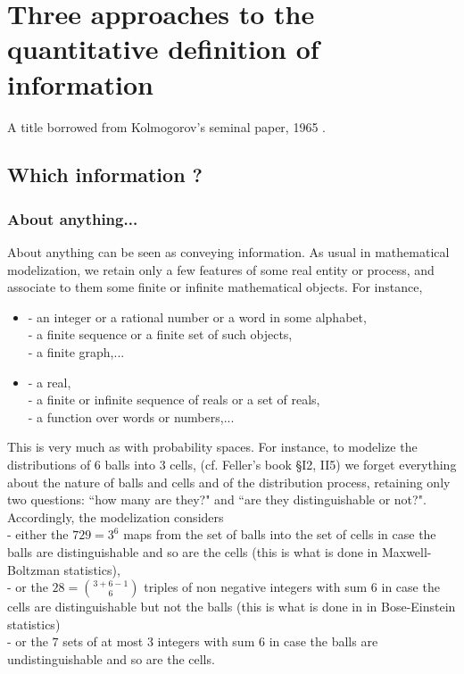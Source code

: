 \section{Three approaches to the quantitative definition
of information}
A title borrowed from Kolmogorov's seminal paper,
1965 \cite{kolmo65}.
\subsection{Which information ?}
\subsubsection{About anything...}
About anything can be seen as conveying information.
As usual in mathematical modelization,
we retain only a few features of some real entity or process,
and associate to them some finite or infinite mathematical objects.
For instance,
\begin{itemize}
\item
- an integer or a rational number or a word in some alphabet,
\\- a finite sequence or a finite set of such objects,
\\- a finite graph,...
\item
- a real,
\\- a finite or infinite sequence of reals or a set of reals,
\\- a function over words or numbers,...
\end{itemize}
This is very much as with probability spaces. For instance,
to modelize the distributions of $6$ balls into $3$ cells,
(cf. Feller's book \cite{feller} \S I2, II5)
we forget everything about the nature of balls and cells
and of the distribution process,
retaining only two questions: ``how many are they?" and
``are they distinguishable or not?".
Accordingly, the modelization considers
\\
- either the $729=3^6$ maps from the set of balls
into the set of cells
in case the balls are distinguishable and so are the cells
(this is what is done in Maxwell-Boltzman statistics),
\\
- or the $28=\binom{3+6-1}{6}$ triples of non negative integers with sum $6$
in case the cells are distinguishable but not the balls
(this is what is done in in Bose-Einstein statistics)
\\
- or the $7$ sets of at most $3$ integers with sum $6$
in case the balls are undistinguishable and so are the cells.
